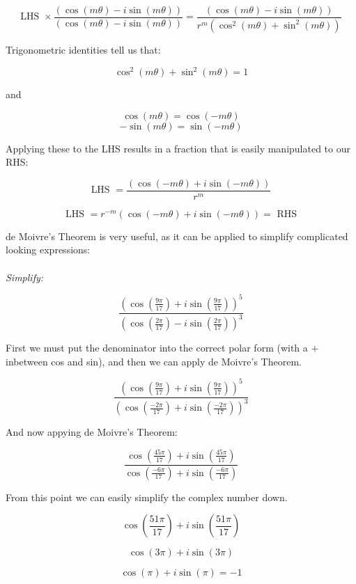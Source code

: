 \documentclass{article}
\begin{document}
\[\text{LHS  }\times\frac{\left(\cos\left(m\theta\right)-i\sin\left(m\theta\right)\right)}{\left(\cos\left(m\theta\right)-i\sin\left(m\theta\right)\right)}=\frac{\left(\cos\left(m\theta\right)-i\sin\left(m\theta\right)\right)}{r^m\left(\cos^2\left(m\theta\right)+\sin^2\left(m\theta\right)\right)}\]

\noindent Trigonometric identities tell us that:

\[\cos^2\left(m\theta\right)+\sin^2\left(m\theta\right)=1\]

\noindent and

\[\cos\left(m\theta\right)=\cos\left(-m\theta\right)\]
\[-\sin\left(m\theta\right)=\sin\left(-m\theta\right)\]

\noindent Applying these to the LHS results in a fraction that is easily manipulated to our RHS:

\[\text{LHS  }=\frac{\left(\cos\left(-m\theta\right)+i\sin\left(-m\theta\right)\right)}{r^m}\]

\[\text{LHS  }=r^{-m}\left(\cos\left(-m\theta\right)+i\sin\left(-m\theta\right)\right)=\text{  RHS}\]

\noindent de Moivre's Theorem is very useful, as it can be applied to simplify complicated looking expressions: \\\\

\noindent \textit{Simplify:}

\[\frac{\left(\cos\left(\frac{9\pi}{17}\right)+i\sin\left(\frac{9\pi}{17}\right)\right)^5}{\left(\cos\left(\frac{2\pi}{17}\right)-i\sin\left(\frac{2\pi}{17}\right)\right)^3}\]

\noindent First we must put the denominator into the correct polar form (with a \(+\) inbetween cos and sin), and then we can apply de Moivre's Theorem.

\[\frac{\left(\cos\left(\frac{9\pi}{17}\right)+i\sin\left(\frac{9\pi}{17}\right)\right)^5}{\left(\cos\left(\frac{-2\pi}{17}\right)+i\sin\left(\frac{-2\pi}{17}\right)\right)^3}\]

\noindent And now appying de Moivre's Theorem:

\[\frac{\cos\left(\frac{45\pi}{17}\right)+i\sin\left(\frac{45\pi}{17}\right)}{\cos\left(\frac{-6\pi}{17}\right)+i\sin\left(\frac{-6\pi}{17}\right)}\]

\noindent From this point we can easily simplify the complex number down.

\[\cos\left(\frac{51\pi}{17}\right)+i\sin\left(\frac{51\pi}{17}\right)\]

\[\cos\left(3\pi\right)+i\sin\left(3\pi\right)\]

\[\cos\left(\pi\right)+i\sin\left(\pi\right)=-1\]
\end{document}
